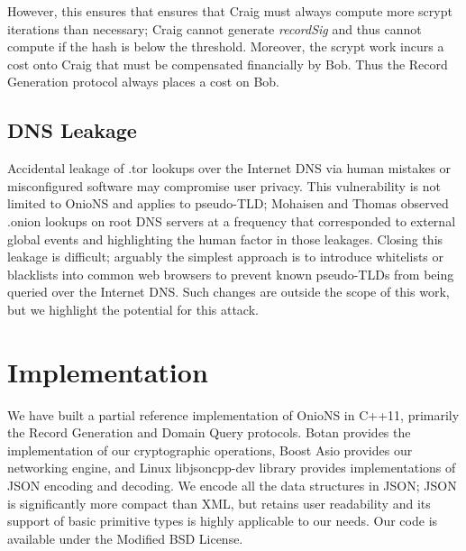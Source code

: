 \documentclass{sig-alternate}
\begin{document}

However, this ensures that ensures that Craig must always compute more scrypt iterations than necessary; Craig cannot generate \emph{recordSig} and thus cannot compute if the hash is below the threshold. Moreover, the scrypt work incurs a cost onto Craig that must be compensated financially by Bob. Thus the Record Generation protocol always places a cost on Bob.

\subsection{DNS Leakage}

Accidental leakage of .tor lookups over the Internet DNS via human mistakes or misconfigured software may compromise user privacy. This vulnerability is not limited to OnioNS and applies to pseudo-TLD; Mohaisen and Thomas observed .onion lookups on root DNS servers at a frequency that corresponded to external global events and highlighting the human factor in those leakages.\cite{thomasmeasuring} Closing this leakage is difficult; arguably the simplest approach is to introduce whitelists or blacklists into common web browsers to prevent known pseudo-TLDs from being queried over the Internet DNS. Such changes are outside the scope of this work, but we highlight the potential for this attack.

\newpage

\section{Implementation}

We have built a partial reference implementation of OnioNS in C++11, primarily the Record Generation and Domain Query protocols. Botan provides the implementation of our cryptographic operations, Boost Asio provides our networking engine, and Linux libjsoncpp-dev library provides implementations of JSON encoding and decoding. We encode all the data structures in JSON; JSON is significantly more compact than XML, but retains user readability and its support of basic primitive types is highly applicable to our needs. Our code is available under the Modified BSD License. %

\end{document}
